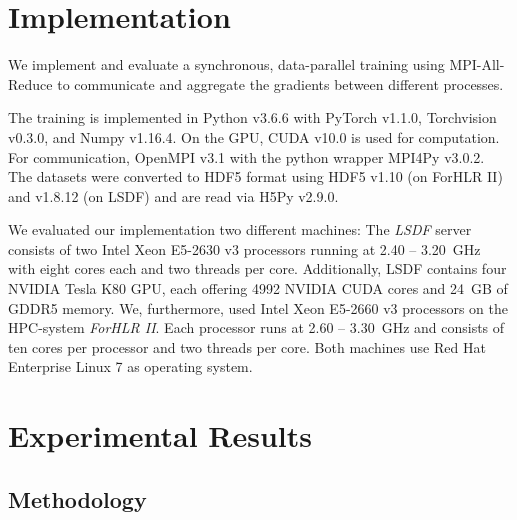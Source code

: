 \documentclass[conference,compsoc,a4paper]{IEEEtran}
\begin{document}




\section{Implementation} %
\label{sec:implementation}
We implement and evaluate a synchronous, data-parallel training using MPI-All-Reduce to communicate and aggregate the gradients between different processes.

The training is implemented in Python v3.6.6 with PyTorch v1.1.0, Torchvision v0.3.0, and Numpy v1.16.4.
On the GPU, CUDA v10.0 is used for computation.
For communication, OpenMPI v3.1 with the python wrapper MPI4Py v3.0.2.
The datasets were converted to HDF5 format using HDF5 v1.10 (on ForHLR II) and v1.8.12 (on LSDF) and are read via H5Py v2.9.0.

We evaluated our implementation two different machines:
The \emph{LSDF} server consists of two Intel Xeon E5-2630 v3 processors running at 2.40 – 3.20~GHz with eight cores each and two threads per core.
Additionally, LSDF contains four NVIDIA Tesla K80 GPU, each offering 4992 NVIDIA CUDA cores and 24~GB of GDDR5 memory.
%
We, furthermore, used Intel Xeon E5-2660 v3 processors on the HPC-system \emph{ForHLR II}. %
Each processor runs at 2.60 – 3.30~GHz and consists of ten cores per processor and two threads per core.
%
Both machines use Red Hat Enterprise Linux 7 as operating system.



\section{Experimental Results} %
\label{sec:experimental_results}

\subsection{Methodology} %
\label{sub:methodology}
\end{document}
